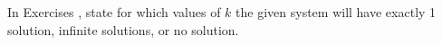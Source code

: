 {In Exercises }
{, state for which values of $k$ the given system will have exactly 1 solution, infinite solutions, or no solution.}
